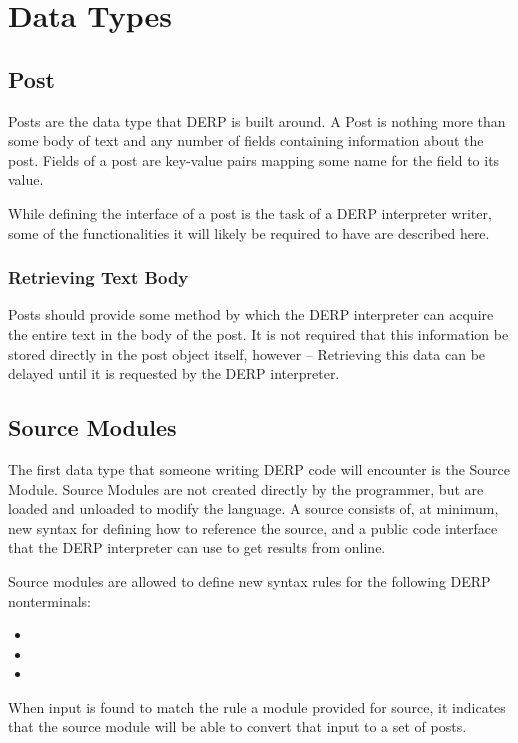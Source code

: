 \section{Data Types}

\subsection{Post}
Posts are the data type that DERP is built around. A Post is nothing more than some body
of text and any number of fields containing information about the post. Fields of a post
are key-value pairs mapping some name for the field to its value.

While defining the interface of a post is the task of a DERP interpreter writer, some of
the functionalities it will likely be required to have are described here.

\subsubsection{Retrieving Text Body}
Posts should provide some method by which the DERP interpreter can acquire the entire
text in the body of the post. It is not required that this information be stored directly
in the post object itself, however -- Retrieving this data can be delayed until it is
requested by the DERP interpreter.

\subsection{Source Modules}
The first data type that someone writing DERP code will encounter is the Source Module.
Source Modules are not created directly by the programmer, but are loaded and unloaded to
modify the language. A source consists of, at minimum, new syntax for defining how to
reference the source, and a public code interface that the DERP interpreter can use to
get results from online.

Source modules are allowed to define new syntax rules for the following DERP nonterminals:
\begin{itemize}
\item {}
\item {}
\item {}
\end{itemize}
When input is found to match the rule a module provided for source, it indicates that the
source module will be able to convert that input to a set of posts.

